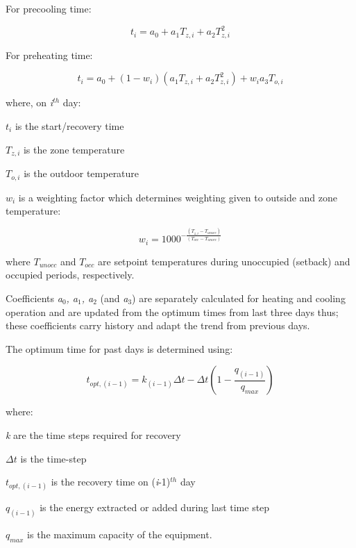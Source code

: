 For precooling time:

\begin{equation}
{t_i} = {a_0} + {a_1}{T_{z,i}} + {a_2}T_{z,i}^2
\end{equation}

For preheating time:

\begin{equation}
{t_i} = {a_0} + \left( {1 - {w_i}} \right)({a_1}{T_{z,i}} + {a_2}T_{z,i}^2) + {w_i}{a_3}{T_{o,i}}
\end{equation}

where, on \emph{i}\(^{th}\) day:

\(t_{i}\) is the start/recovery time

\(T_{z,i}\) is the zone temperature

\(T_{o,i}\) is the outdoor temperature

\(w_{i}\) is a weighting factor which determines weighting given to outside and zone temperature:

\begin{equation}
{w_i} = {1000^{ - \frac{{\left( {{T_{z,i}} - {T_{unocc}}} \right)}}{{\left( {{T_{occ}} - {T_{unocc}}} \right)}}}}
\end{equation}

where \(T_{unocc}\) and \(T_{occ}\) are setpoint temperatures during unoccupied (setback) and occupied periods, respectively.

Coefficients \emph{a\(_{0}\), a\(_{1}\), a\(_{2}\)} (and \emph{a\(_{3}\)}) are separately calculated for heating and cooling operation and are updated from the optimum times from last three days thus; these coefficients carry history and adapt the trend from previous days.

The optimum time for past days is determined using:

\begin{equation}
{t_{opt,\left( {i - 1} \right)}} = {k_{\left( {i - 1} \right)}}\Delta t - \Delta t\left( {1 - \frac{{{q_{\left( {i - 1} \right)}}}}{{{q_{max}}}}} \right)
\end{equation}

where:

\emph{k} are the time steps required for recovery

\({\Delta t}\) is the time-step

\(t_{opt,(i-1)}\) is the recovery time on (\emph{i}-1)\(^{th}\) day

\(q_{(i-1)}\) is the energy extracted or added during last time step

\(q_{max}\) is the maximum capacity of the equipment.
